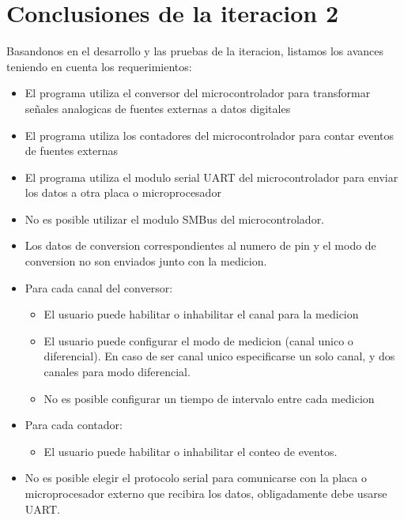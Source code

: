 
\section{Conclusiones de la iteracion 2} %
\label{it2:sec:conclusiones_de_la_iteracion_2}

Basandonos en el desarrollo y las pruebas de la iteracion, listamos los avances teniendo en cuenta los requerimientos:

\begin{itemize}
\item El programa utiliza el conversor del microcontrolador para transformar señales analogicas de fuentes externas a datos digitales
\item El programa utiliza los contadores del microcontrolador para contar eventos de fuentes externas
\item El programa utiliza el modulo serial UART del microcontrolador para enviar los datos a otra placa o microprocesador
\item No es posible utilizar el modulo SMBus del microcontrolador.
\item Los datos de conversion correspondientes al numero de pin y el modo de conversion no son enviados junto con la medicion.
\item Para cada canal del conversor:
\begin{itemize}
\item El usuario puede habilitar o inhabilitar el canal para la medicion
\item El usuario puede configurar el modo de medicion (canal unico o diferencial). En caso de ser canal unico especificarse un solo canal, y dos canales para modo diferencial.
\item No es posible configurar un tiempo de intervalo entre cada medicion
\end{itemize}
\item Para cada contador:
\begin{itemize}
\item El usuario puede habilitar o inhabilitar el conteo de eventos.
\end{itemize}
\item No es posible elegir el protocolo serial para comunicarse con la placa o microprocesador externo que recibira los datos, obligadamente debe usarse UART.

\end{itemize}

